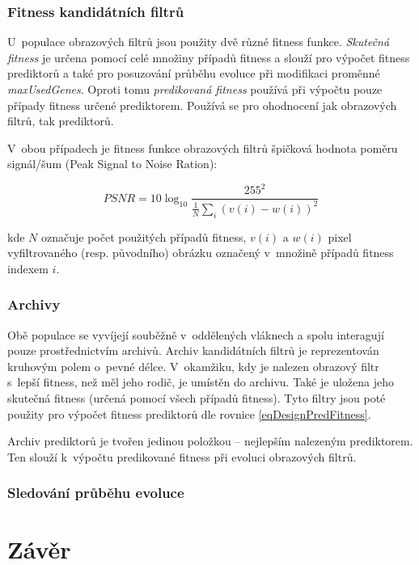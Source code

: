 \subsection{Fitness kandidátních filtrů}

U~populace obrazových filtrů jsou použity dvě různé fitness funkce. \emph{Skutečná fitness} je určena pomocí celé množiny případů fitness a slouží pro výpočet fitness prediktorů a také pro posuzování průběhu evoluce při modifikaci proměnné \emph{maxUsedGenes}. Oproti tomu \emph{predikovaná fitness} používá při výpočtu pouze případy fitness určené prediktorem. Používá se pro ohodnocení jak obrazových filtrů, tak prediktorů.

V~obou případech je fitness funkce obrazových filtrů špičková hodnota poměru signál/šum (Peak Signal to Noise Ration):

\begin{equation}
    \label{eqDesignPSNR}
    \mathit{PSNR} = 10 \log_{10} \frac{255^2}{\frac{1}{N} \sum\limits_i \left( v\left( i \right) - w\left( i \right)  \right)^2 }
\end{equation}

\noindent{}kde $N$ označuje počet použitých případů fitness, $v(i)$ a $w(i)$ pixel vyfiltrovaného (resp. původního) obrázku označený v~množině případů fitness indexem $i$.

\subsection{Archivy}

Obě populace se vyvíjejí souběžně v~oddělených vláknech a spolu interagují pouze prostřednictvím archivů. Archiv kandidátních filtrů je reprezentován kruhovým polem o~pevné délce. V~okamžiku, kdy je nalezen obrazový filtr s~lepší fitness, než měl jeho rodič, je umístěn do archivu. Také je uložena jeho skutečná fitness (určená pomocí všech případů fitness). Tyto filtry jsou poté použity pro výpočet fitness prediktorů dle rovnice \ref{eqDesignPredFitness}.

Archiv prediktorů je tvořen jedinou položkou -- nejlepším nalezeným prediktorem. Ten slouží k~výpočtu predikované fitness při evoluci obrazových filtrů.

\subsection{Sledování průběhu evoluce}

\chapter{Závěr}

\blind
\blind

